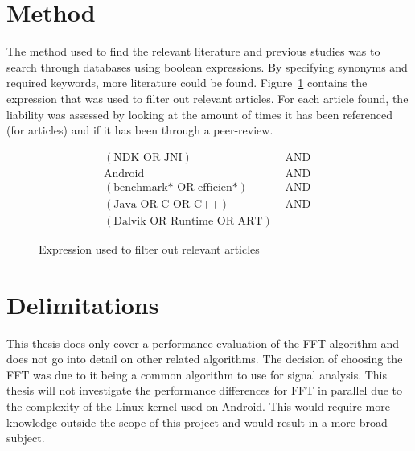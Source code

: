 \section{Method}

The method used to find the relevant literature and previous studies was to search through databases using boolean expressions. By specifying synonyms and required keywords, more literature could be found. Figure~\ref{fig:db:search} contains the expression that was used to filter out relevant articles. For each article found, the liability was assessed by looking at the amount of times it has been referenced (for articles) and if it has been through a peer-review.

\begin{figure}
    \centering
    \begin{align*}
        (\text{NDK OR JNI})               & \text{ AND } \\
        \text{Android}                    & \text{ AND } \\
        (\text{benchmark* OR efficien*})  & \text{ AND } \\
        (\text{Java OR C OR C++})         & \text{ AND } \\
        (\text{Dalvik OR Runtime OR ART}) &
    \end{align*}
    \caption{Expression used to filter out relevant articles}
    \label{fig:db:search}
\end{figure}


\section{Delimitations}
This thesis does only cover a performance evaluation of the FFT algorithm and does not go into detail on other related algorithms. The decision of choosing the FFT was due to it being a common algorithm to use for signal analysis. This thesis will not investigate the performance differences for FFT in parallel due to the complexity of the Linux kernel used on Android. This would require more knowledge outside the scope of this project and would result in a more broad subject.

